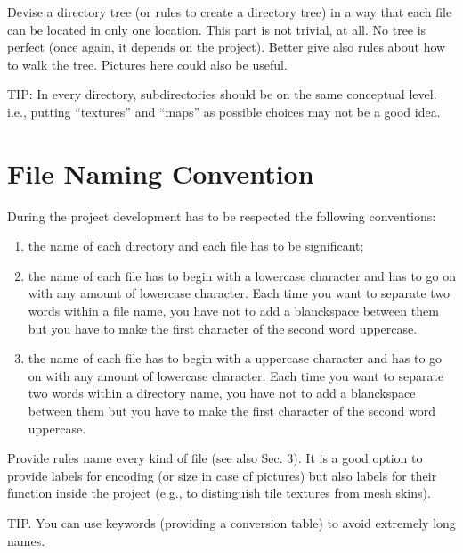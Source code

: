 \documentclass[12pt]{article}
\begin{document}
Devise a directory tree (or rules to create a directory tree) in a way that each file can be located in only one location.
This part is not trivial, at all.
No tree is perfect (once again, it depends on the project). Better give also rules about how to walk the tree.
Pictures here could also be useful.

TIP: In every directory, subdirectories should be on the same conceptual level. i.e., putting “textures” and “maps” as possible choices may not be a good idea.

\section{File Naming Convention}
During the project development has to be respected the following conventions:
\begin{enumerate}
  \item the name of each directory and each file has to be significant;
  \item the name of each file has to begin with a lowercase character and has to go on with any amount of lowercase character. Each time you want to separate two words within a file name, you have not to add a blanckspace between them but you have to make the first character of the second word uppercase.
  \item the name of each file has to begin with a uppercase character and has to go on with any amount of lowercase character. Each time you want to separate two words within a directory name, you have not to add a blanckspace between them but you have to make the first character of the second word uppercase.
\end{enumerate}


Provide rules name every kind of file (see also Sec. 3).
It is a good option to provide labels for encoding (or size in case of pictures) but also labels for their function inside the project (e.g., to distinguish tile textures from mesh skins).

TIP. You can use keywords (providing a conversion table) to avoid extremely long names.
\end{document}
